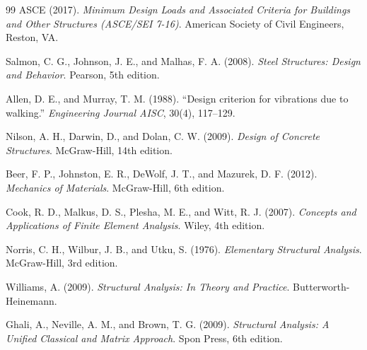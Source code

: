 \documentclass[11pt,a4paper]{article}
\begin{document}
\begin{thebibliography}{99}
ASCE (2017). \textit{Minimum Design Loads and Associated Criteria for Buildings and Other Structures (ASCE/SEI 7-16)}. American Society of Civil Engineers, Reston, VA.

Salmon, C. G., Johnson, J. E., and Malhas, F. A. (2008). \textit{Steel Structures: Design and Behavior}. Pearson, 5th edition.

Allen, D. E., and Murray, T. M. (1988). ``Design criterion for vibrations due to walking.'' \textit{Engineering Journal AISC}, 30(4), 117--129.

Nilson, A. H., Darwin, D., and Dolan, C. W. (2009). \textit{Design of Concrete Structures}. McGraw-Hill, 14th edition.

Beer, F. P., Johnston, E. R., DeWolf, J. T., and Mazurek, D. F. (2012). \textit{Mechanics of Materials}. McGraw-Hill, 6th edition.

Cook, R. D., Malkus, D. S., Plesha, M. E., and Witt, R. J. (2007). \textit{Concepts and Applications of Finite Element Analysis}. Wiley, 4th edition.

Norris, C. H., Wilbur, J. B., and Utku, S. (1976). \textit{Elementary Structural Analysis}. McGraw-Hill, 3rd edition.

Williams, A. (2009). \textit{Structural Analysis: In Theory and Practice}. Butterworth-Heinemann.

Ghali, A., Neville, A. M., and Brown, T. G. (2009). \textit{Structural Analysis: A Unified Classical and Matrix Approach}. Spon Press, 6th edition.

\end{thebibliography}
\end{document}
